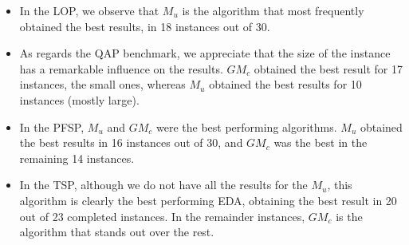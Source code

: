 \documentclass[conference]{IEEEtran}
\begin{document}
\begin{itemize}
\item In the LOP, we observe that $M_u$ is the algorithm that most frequently obtained the best results, in 18 instances out of 30.
\item As regards the QAP benchmark, we appreciate that the size of the instance has a remarkable influence on the results. $GM_c$ obtained the best result for 17 instances, the small ones, whereas $M_u$ obtained the best results for 10 instances (mostly large).
\item In the PFSP, $M_u$ and $GM_c$ were the best performing algorithms. $M_u$ obtained the best results in 16 instances out of 30, and $GM_c$ was the best in the remaining 14 instances.
\item In the TSP, although we do not have all the results for the $M_u$, this algorithm is clearly the best performing EDA, obtaining the best result in 20 out of 23 completed instances. In the remainder instances, $GM_c$ is the algorithm that stands out over the rest.
\end{itemize}
\end{document}

